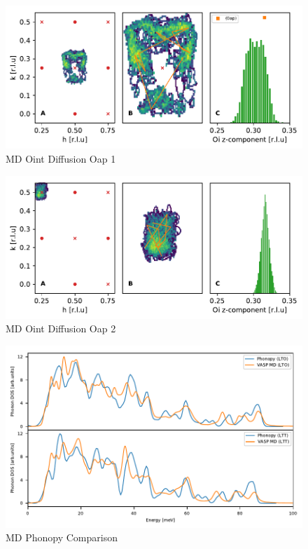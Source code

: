 \begin{figure}
	\centering
	\includegraphics[width=\textwidth]{fig/simulation/diffusion2.pdf}
	\caption[MD Oint Diffusion Oap 1]{MD Oint Diffusion Oap 1}
	\label{fig:md_diffusion2}
\end{figure}

\begin{figure}
	\centering
	\includegraphics[width=\textwidth]{fig/simulation/diffusion3.pdf}
	\caption[MD Oint Diffusion Oap 2]{MD Oint Diffusion Oap 2}
	\label{fig:md_diffusion3}
\end{figure}


\begin{figure}
	\centering
	\includegraphics[width=\textwidth]{fig/simulation/md_phonopy_comparison.pdf}
	\caption[MD Phonopy Comparison]{MD Phonopy Comparison}
	\label{fig:md_phonopy_comparison}
\end{figure}

